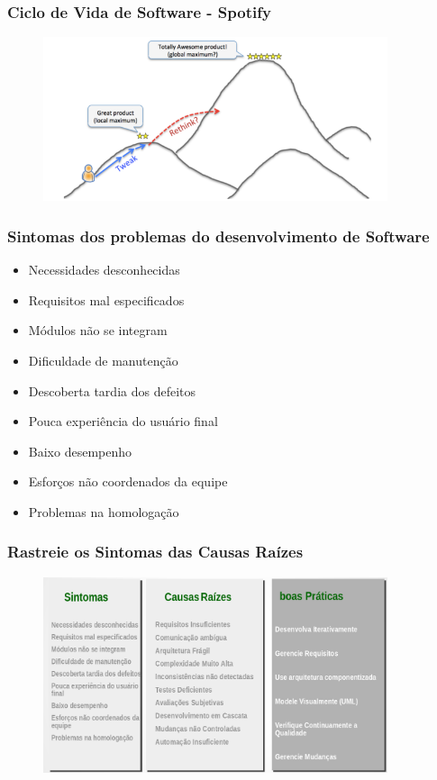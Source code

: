 \begin{frame}
 \frametitle{Ciclo de Vida de Software - Spotify}
  \begin{figure}
   \centering
   \includegraphics[width = 0.9\textwidth]{figs/011.png}
  \end{figure}	
\end{frame}

\begin{frame}
 \frametitle{Sintomas dos problemas do desenvolvimento de Software}
 \begin{itemize}
  \item Necessidades desconhecidas
  \item Requisitos mal especificados
  \item Módulos não se integram
  \item Dificuldade de manutenção
  \item Descoberta tardia dos defeitos
  \item Pouca experiência do usuário final
  \item Baixo desempenho
  \item Esforços não coordenados da equipe
  \item Problemas na homologação
 \end{itemize}	
\end{frame}

\begin{frame}
 \frametitle{Rastreie os Sintomas das Causas Raízes}
  \begin{figure}
   \centering
   \includegraphics[width = 0.9\textwidth]{figs/fig5.png}
  \end{figure}
\end{frame}

